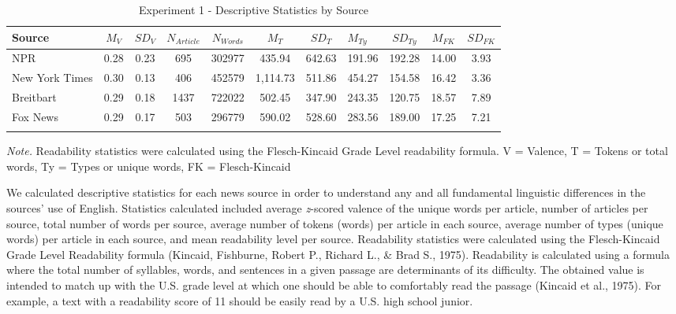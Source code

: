 \documentclass[
  english,
  man]{apa6}
\begin{document}
\begin{table}[pt]

\begin{center}
\begin{threeparttable}

\caption{\label{tab:exp1-source-descriptives}Experiment 1 - Descriptive Statistics by Source}

\footnotesize{

\begin{tabular}{lcccccclccc}
\toprule
Source & $M_V$ & $SD_V$ & $N_{Article}$ & $N_{Words}$ & $M_T$ & $SD_T$ & $M_{Ty}$ & $SD_{Ty}$ & $M_{FK}$ & $SD_{FK}$\\
\midrule
NPR & 0.28 & 0.23 & 695 & 302977 & 435.94 & 642.63 & 191.96 & 192.28 & 14.00 & 3.93\\
New York Times & 0.30 & 0.13 & 406 & 452579 & 1,114.73 & 511.86 & 454.27 & 154.58 & 16.42 & 3.36\\
Breitbart & 0.29 & 0.18 & 1437 & 722022 & 502.45 & 347.90 & 243.35 & 120.75 & 18.57 & 7.89\\
Fox News & 0.29 & 0.17 & 503 & 296779 & 590.02 & 528.60 & 283.56 & 189.00 & 17.25 & 7.21\\
\bottomrule
\addlinespace
\end{tabular}

}

\begin{tablenotes}[para]
\normalsize{\textit{Note.} Readability statistics were calculated using the Flesch-Kincaid Grade Level readability formula. V = Valence, T = Tokens or total words, Ty = Types or unique words, FK = Flesch-Kincaid}
\end{tablenotes}

\end{threeparttable}
\end{center}

\end{table}

We calculated descriptive statistics for each news source in order to understand any and all fundamental linguistic differences in the sources' use of English. Statistics calculated included average \emph{z}-scored valence of the unique words per article, number of articles per source, total number of words per source, average number of tokens (words) per article in each source, average number of types (unique words) per article in each source, and mean readability level per source. Readability statistics were calculated using the Flesch-Kincaid Grade Level Readability formula (Kincaid, Fishburne, Robert P., Richard L., \& Brad S., 1975). Readability is calculated using a formula where the total number of syllables, words, and sentences in a given passage are determinants of its difficulty. The obtained value is intended to match up with the U.S. grade level at which one should be able to comfortably read the passage (Kincaid et al., 1975). For example, a text with a readability score of 11 should be easily read by a U.S. high school junior.
\end{document}
